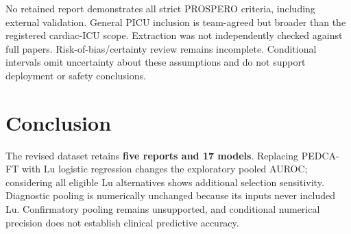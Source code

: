 \documentclass[10pt,a4paper]{article}
\begin{document}
No retained report demonstrates all strict PROSPERO criteria, including external validation. General PICU inclusion is team-agreed but broader than the registered cardiac-ICU scope. Extraction was not independently checked against full papers. Risk-of-bias/certainty review remains incomplete. Conditional intervals omit uncertainty about these assumptions and do not support deployment or safety conclusions.
\section*{Conclusion}
The revised dataset retains \textbf{five reports and 17 models}. Replacing PEDCA-FT with Lu logistic regression changes the exploratory pooled AUROC; considering all eligible Lu alternatives shows additional selection sensitivity. Diagnostic pooling is numerically unchanged because its inputs never included Lu. Confirmatory pooling remains unsupported, and conditional numerical precision does not establish clinical predictive accuracy.
\end{document}
